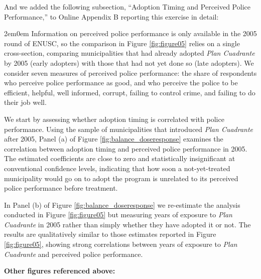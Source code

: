 And we added the following subsection, ``Adoption Timing and Perceived Police Performance,'' to Online Appendix B reporting this exercise in detail:

\begin{adjustwidth}{2em}{0em}
Information on perceived police performance is only available in the 2005 round of ENUSC, so the comparison in Figure \ref{fig:figure05} relies on a single cross-section, comparing municipalities that had already adopted \emph{Plan Cuadrante} by 2005 (early adopters) with those that had not yet done so (late adopters). We consider seven measures of perceived police performance: the share of respondents who perceive police performance as good, and who perceive the police to be efficient, helpful, well informed, corrupt, failing to control crime, and failing to do their job well.

We start by assessing whether adoption timing is correlated with police performance. Using the sample of municipalities that introduced \emph{Plan Cuadrante} after 2005, Panel (a) of Figure \ref{fig:balance_doseresponse} examines the correlation between adoption timing and perceived police performance in 2005. The estimated coefficients are close to zero and statistically insignificant at conventional confidence levels, indicating that how soon a not-yet-treated municipality would go on to adopt the program is unrelated to its perceived police performance before treatment.

In Panel (b) of Figure \ref{fig:balance_doseresponse} we re-estimate the analysis conducted in Figure \ref{fig:figure05} but measuring years of exposure to \emph{Plan Cuadrante} in 2005 rather than simply whether they have adopted it or not. The results are qualitatively similar to those estimates reported in Figure \ref{fig:figure05}, showing strong correlations between years of exposure to \emph{Plan Cuadrante} and perceived police performance.
\end{adjustwidth}

\clearpage
\noindent\textbf{Other figures referenced above:}
\vspace{0.5em}

{\setcounter{figure}{3}\renewcommand{\thefigure}{\arabic{figure}}
}

\clearpage

{\renewcommand{\thefigure}{B.6}
}

\clearpage

